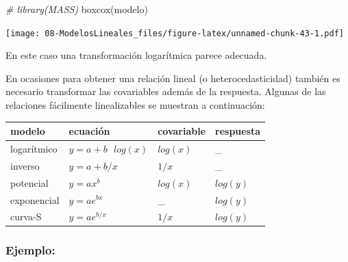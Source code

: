 \documentclass[
]{book}
\newenvironment{Shaded}{\begin{snugshade}}{\end{snugshade}}
\newcommand{\CommentTok}[1]{\textcolor[rgb]{0.56,0.35,0.01}{\textit{#1}}}
\newcommand{\FunctionTok}[1]{\textcolor[rgb]{0.00,0.00,0.00}{#1}}
\newcommand{\NormalTok}[1]{#1}
\theoremstyle{break}
\theoremstyle{nonumberplain}
\begin{document}
\begin{Shaded}
\begin{Highlighting}[]
\CommentTok{\# library(MASS)}
\FunctionTok{boxcox}\NormalTok{(modelo)}
\end{Highlighting}
\end{Shaded}

\texttt{[image: 08-ModelosLineales\_files/figure-latex/unnamed-chunk-43-1.pdf]}

En este caso una transformación logarítmica parece adecuada.

En ocasiones para obtener una relación lineal (o heterocedasticidad) también es
necesario transformar las covariables además de la respuesta. Algunas de
las relaciones fácilmente linealizables se muestran a continuación:

\begin{longtable}[]{@{}llll@{}}
\toprule
modelo & ecuación & covariable & respuesta \\
\midrule
\endhead
logarítmico & \(y = a + b\text{ }log(x)\) & \(log(x)\) & \_ \\
inverso & \(y = a + b/x\) & \(1/x\) & \_ \\
potencial & \(y = ax^b\) & \(log(x)\) & \(log(y)\) \\
exponencial & \(y = ae^{bx}\) & \_ & \(log(y)\) \\
curva-S & \(y = ae^{b/x}\) & \(1/x\) & \(log(y)\) \\
\bottomrule
\end{longtable}

\hypertarget{ejemplo-1}{%
\subsubsection{Ejemplo:}\label{ejemplo-1}}
\end{document}
